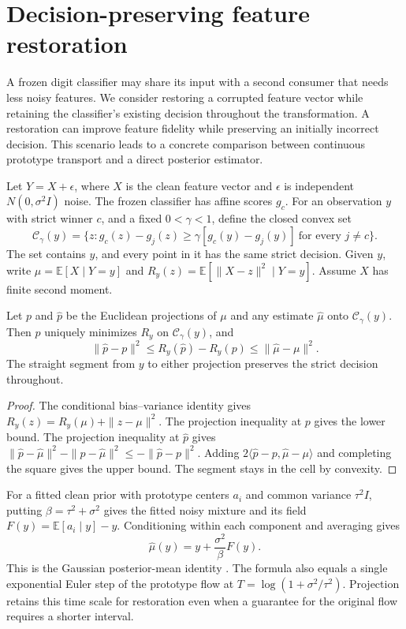 \section{Decision-preserving feature restoration}
\label{sec:decision-safe-restoration}

A frozen digit classifier may share its input with a second consumer that needs less noisy features. We consider restoring a corrupted feature vector while retaining the classifier's existing decision throughout the transformation. A restoration can improve feature fidelity while preserving an initially incorrect decision. This scenario leads to a concrete comparison between continuous prototype transport and a direct posterior estimator.

Let \(Y=X+\epsilon\), where \(X\) is the clean feature vector and \(\epsilon\) is independent \(N(0,\sigma^2 I)\) noise. The frozen classifier has affine scores \(g_c\). For an observation \(y\) with strict winner \(c\), and a fixed \(0<\gamma<1\), define the closed convex set
\[
 \mathcal C_\gamma(y)=\{z:g_c(z)-g_j(z)\ge
          \gamma[g_c(y)-g_j(y)]\ \text{for every }j\ne c\}.
\]
The set contains \(y\), and every point in it has the same strict decision. Given \(y\), write \(\mu=\mathbb E[X\mid Y=y]\) and \(R_y(z)=\mathbb E[\|X-z\|^2\mid Y=y]\). Assume \(X\) has finite second moment.

\begin{lemma}
\label{lem:restoration-projection}
Let \(p\) and \(\widehat p\) be the Euclidean projections of \(\mu\) and any estimate \(\widehat\mu\) onto \(\mathcal C_\gamma(y)\). Then \(p\) uniquely minimizes \(R_y\) on \(\mathcal C_\gamma(y)\), and
\[
 \|\widehat p-p\|^2 \le R_y(\widehat p)-R_y(p)
                       \le \|\widehat\mu-\mu\|^2 .
\]
The straight segment from \(y\) to either projection preserves the strict decision throughout.
\end{lemma}

\begin{proof}
The conditional bias--variance identity gives \(R_y(z)=R_y(\mu)+\|z-\mu\|^2\). The projection inequality at \(p\) gives the lower bound. The projection inequality at \(\widehat p\) gives
\(\|\widehat p-\widehat\mu\|^2-\|p-\widehat\mu\|^2\le-\|\widehat p-p\|^2\).
Adding \(2\langle\widehat p-p,\widehat\mu-\mu\rangle\) and completing the square gives the upper bound. The segment stays in the cell by convexity.
\end{proof}

For a fitted clean prior with prototype centers \(a_i\) and common variance \(\tau^2 I\), putting \(\beta=\tau^2+\sigma^2\) gives the fitted noisy mixture and its field \(F(y)=\mathbb E[a_i\mid y]-y\). Conditioning within each component and averaging gives
\[
 \widehat\mu(y)=y+\frac{\sigma^2}{\beta}F(y).
\]
This is the Gaussian posterior-mean identity
\cite{efron}. The formula also equals a single exponential Euler step of the prototype flow at \(T=\log(1+\sigma^2/\tau^2)\). Projection retains this time scale for restoration even when a guarantee for the original flow requires a shorter interval.

